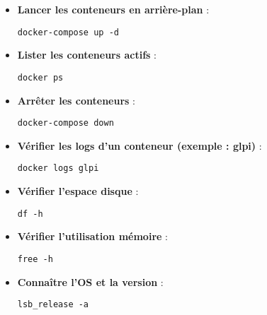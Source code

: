 \documentclass[11pt,a4paper]{article}
\begin{document}
\begin{tcolorbox}[title={5. Commandes Docker importantes}]
\begin{itemize}
  \item \textbf{Lancer les conteneurs en arrière-plan} :
\begin{verbatim}
docker-compose up -d
\end{verbatim}

  \item \textbf{Lister les conteneurs actifs} :
\begin{verbatim}
docker ps
\end{verbatim}

  \item \textbf{Arrêter les conteneurs} :
\begin{verbatim}
docker-compose down
\end{verbatim}

  \item \textbf{Vérifier les logs d’un conteneur (exemple : glpi)} :
\begin{verbatim}
docker logs glpi
\end{verbatim}
\end{itemize}
\end{tcolorbox}

\begin{tcolorbox}[title={6. Commandes système utiles}]
\begin{itemize}
  \item \textbf{Vérifier l’espace disque} :
\begin{verbatim}
df -h
\end{verbatim}

  \item \textbf{Vérifier l’utilisation mémoire} :
\begin{verbatim}
free -h
\end{verbatim}

  \item \textbf{Connaître l’OS et la version} :
\begin{verbatim}
lsb_release -a
\end{verbatim}
\end{itemize}
\end{tcolorbox}
\end{document}
